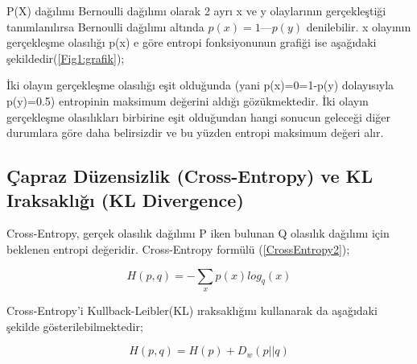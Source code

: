 \documentclass[12pt, a4paper]{article}
\begin{document}
			P(X) dağılımı Bernoulli dağılımı olarak 2 ayrı x ve y olaylarının gerçekleştiği tanımlanılırsa Bernoulli dağılımı altında $p(x) = 1 — p(y)$ denilebilir. x olayının gerçekleşme olasılığı p(x) e göre entropi fonksiyonunun grafiği ise aşağıdaki şekildedir(\ref{Fig1:grafik});
			\begin {center}
			\end {center}
			
			İki olayın gerçekleşme olasılığı eşit olduğunda (yani p(x)=0=1-p(y) dolayısıyla p(y)=0.5) entropinin maksimum değerini aldığı gözükmektedir. İki olayın gerçekleşme olasılıkları birbirine eşit olduğundan hangi sonucun geleceği diğer durumlara göre daha belirsizdir ve bu yüzden entropi maksimum değeri alır.
			
			\subsection{Çapraz Düzensizlik (Cross-Entropy) ve KL Iraksaklığı (KL Divergence)}
			Cross-Entropy, gerçek olasılık dağılımı P iken bulunan Q olasılık dağılımı için beklenen entropi değeridir. Cross-Entropy formülü	(\ref{CrossEntropy2});
			\begin {center}
			\begin{equation}H(p,q) = - \sum_{x} p(x) log_q(x)	\label{eqn:Cross-Entropy}
			\end{equation}
			\end {center}
			Cross-Entropy’i Kullback-Leibler(KL) ıraksaklığını kullanarak da aşağıdaki şekilde gösterilebilmektedir;
			\begin {center}
		
				\begin{equation}H(p,q) = H(p) + D_w(p | | q)	\label{eqn:CrossEntropy2}	\end{equation}
			\end {center}
			
\end{document}
